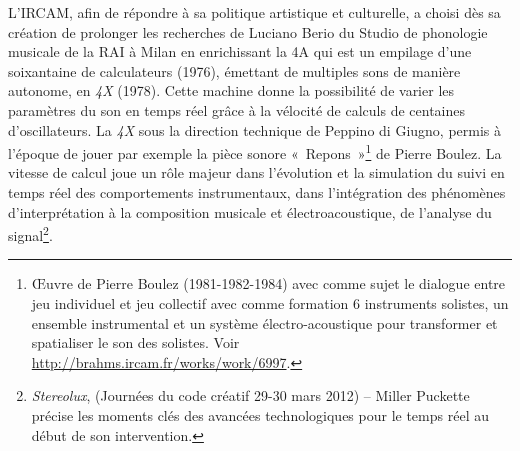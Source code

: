 \documentclass{FramateX}
\begin{document}
\begin{refsection}
L'IRCAM, afin de répondre à sa politique artistique et
culturelle, a choisi dès sa création de prolonger les recherches de Luciano Berio du
Studio de phonologie musicale de la RAI à Milan en enrichissant la 4A
qui est un empilage d'une soixantaine de calculateurs (1976), émettant
de multiples sons de manière autonome, en \textit{4X} (1978). Cette machine
donne la possibilité de varier les paramètres du son en temps réel
grâce à la vélocité de calculs de centaines d'oscillateurs. La \textit{4X} sous
la direction technique de Peppino di Giugno, permis à l'époque de jouer
par exemple la pièce sonore «~Repons~»\footnote{Œuvre de Pierre Boulez
(1981-1982-1984) avec comme sujet le dialogue entre jeu individuel et
jeu collectif avec comme formation 6 instruments solistes, un ensemble
instrumental et un système électro-acoustique pour transformer et
spatialiser le son des solistes. Voir \url{http://brahms.ircam.fr/works/work/6997}.} de Pierre
Boulez. La vitesse de calcul joue un rôle majeur dans l'évolution et la
simulation du suivi en temps réel des comportements instrumentaux,
dans l'intégration des phénomènes d'interprétation à la composition musicale
 et électroacoustique, de l'analyse du signal\footnote{\textit{Stereolux},
(Journées du code créatif 29-30 mars 2012) -- Miller Puckette précise les
moments clés des avancées technologiques pour le temps réel au début de
son intervention.}.


\end{refsection}
\end{document}

